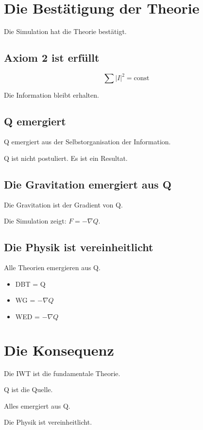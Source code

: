 
\section{Die Bestätigung der Theorie}

Die Simulation hat die Theorie bestätigt.

\subsection{Axiom 2 ist erfüllt}

\[
\sum |I|^2 = \text{const}
\]

Die Information bleibt erhalten.

\subsection{Q emergiert}

Q emergiert aus der Selbstorganisation der Information.

Q ist nicht postuliert. Es ist ein Resultat.

\subsection{Die Gravitation emergiert aus Q}

Die Gravitation ist der Gradient von Q.

Die Simulation zeigt: \( F = -\nabla Q \).

\subsection{Die Physik ist vereinheitlicht}

Alle Theorien emergieren aus Q.

\begin{itemize}
    \item DBT = Q
    \item WG = \( -\nabla Q \)
    \item WED = \( -\nabla Q \)
\end{itemize}

\section{Die Konsequenz}

Die IWT ist die fundamentale Theorie.

Q ist die Quelle.

Alles emergiert aus Q.

Die Physik ist vereinheitlicht.